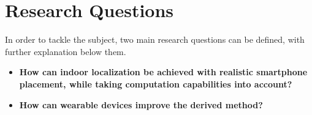  




\section{Research Questions}

In order to tackle the subject, two main research questions can be defined, with further explanation below them.

\begin{itemize}
	\item \textbf{How can indoor localization be achieved with realistic smartphone placement, while taking computation capabilities into account?}
	\item\textbf{How can wearable devices improve the derived method?}
\end{itemize}

